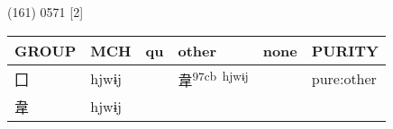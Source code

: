 \documentclass[14pt,a4paper]{scrartcl}
\begin{document}
(161) 0571 {[}2{]}

\begin{longtable}[c]{@{}llllll@{}}
\toprule
\begin{minipage}[b]{0.14\columnwidth}\raggedright\strut
GROUP
\strut\end{minipage} &
\begin{minipage}[b]{0.14\columnwidth}\raggedright\strut
MCH
\strut\end{minipage} &
\begin{minipage}[b]{0.14\columnwidth}\raggedright\strut
qu
\strut\end{minipage} &
\begin{minipage}[b]{0.14\columnwidth}\raggedright\strut
other
\strut\end{minipage} &
\begin{minipage}[b]{0.14\columnwidth}\raggedright\strut
none
\strut\end{minipage} &
\begin{minipage}[b]{0.14\columnwidth}\raggedright\strut
PURITY
\strut\end{minipage}\tabularnewline
\midrule
\endhead
\begin{minipage}[t]{0.14\columnwidth}\raggedright\strut
囗
\strut\end{minipage} &
\begin{minipage}[t]{0.14\columnwidth}\raggedright\strut
hjwɨj
\strut\end{minipage} &
\begin{minipage}[t]{0.14\columnwidth}\raggedright\strut
\strut\end{minipage} &
\begin{minipage}[t]{0.14\columnwidth}\raggedright\strut
韋\textsuperscript{97cb~hjwɨj}
\strut\end{minipage} &
\begin{minipage}[t]{0.14\columnwidth}\raggedright\strut
\strut\end{minipage} &
\begin{minipage}[t]{0.14\columnwidth}\raggedright\strut
pure:other
\strut\end{minipage}\tabularnewline
\begin{minipage}[t]{0.14\columnwidth}\raggedright\strut
韋
\strut\end{minipage} &
\begin{minipage}[t]{0.14\columnwidth}\raggedright\strut
hjwɨj
\strut\end{minipage} &
\begin{minipage}[t]{0.14\columnwidth}\raggedright\strut

\end{minipage}
\end{longtable}
\end{document}
